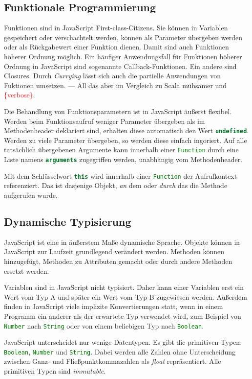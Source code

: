 \documentclass[a4paper, 12pt, hidelinks, listof=totoc, listoftables=totoc, bibliography=totoc]{scrreprt}
\newcommand{\js}[1]{\lstinline[language=JavaScript, style=inline]|#1|}
\newcommand{\TODOi}[1]{\textcolor{red}{\{#1\}}}
\begin{document}
\subsection{Funktionale Programmierung}

Funktionen sind in JavaScript First-class-Citizens. Sie können in Variablen gespeichert oder verschachtelt werden, können als Parameter übergeben werden oder als Rückgabewert einer Funktion dienen. Damit sind auch Funktionen höherer Ordnung möglich. Ein häufiger Anwendungsfall für Funktionen höherer Ordnung in JavaScript sind sogenannte Callback-Funktionen. Ein andere sind Closures. Durch \textit{Currying} lässt sich auch die partielle Anwendungen von Fuktionen umsetzen. --- All das aber im Vergleich zu Scala mühsamer und \TODOi{verbose}.

Die Behandlung von Funktionsparametern ist in JavaScript äußerst flexibel. Werden beim Funktionsaufruf weniger Parameter übergeben als im Methodenheader deklariert sind, erhalten diese automatisch den Wert \js{undefined}. Werden zu viele Parameter übergeben, so werden diese einfach ingoriert. Auf alle tatsächlich übergebenen Argumente kann innerhalb einer \js{Function} durch eine Liste namens \js{arguments} zugegriffen werden, unabhängig vom Methodenheader.

Mit dem Schlüsselwort \js{this} wird innerhalb einer \js{Function} der Aufrufkontext referenziert. Das ist dasjenige Objekt, \textit{an} dem oder \textit{durch} das die Methode aufgerufen wurde. 
\cite[199 ff.]{flanagan2011.JDG}

\subsection{Dynamische Typisierung}

JavaScript ist eine in äußerstem Maße dynamische Sprache. Objekte können in JavaScript zur Laufzeit grundlegend verändert werden. Methoden können hinzugefügt, Methoden zu Attributen gemacht oder durch andere Methoden ersetzt werden.

Variablen sind in JavaScript nicht typisiert. Daher kann einer Variablen erst ein Wert vom Typ A und später ein Wert vom Typ B zugewiesen werden. Außerdem finden in JavaScript viele implizite Konvertierungen statt, wenn in einem Programm ein anderer als der erwartete Typ verwendet wird, zum Beispiel von \js{Number} nach \js{String} oder von einem beliebigen Typ nach \js{Boolean}.

JavaScript unterscheidet nur wenige Datentypen. Es gibt die primitiven Typen: \js{Boolean}, \js{Number} und \js{String}. 
Dabei werden alle Zahlen ohne Unterscheidung zwischen Ganz- und Fließpunktkommazahlen als \textit{float} repräsentiert. Alle primitiven Typen sind \textit{immutable}.
\end{document}
